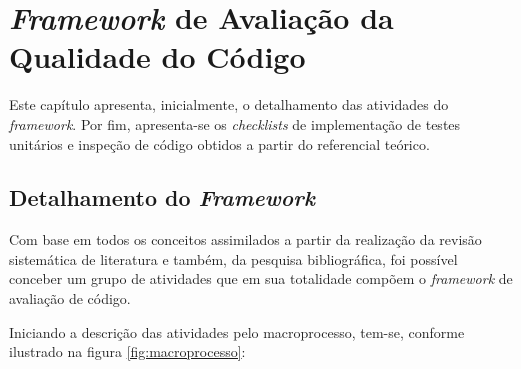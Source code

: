 \chapter{\textit{Framework} de Avaliação da Qualidade do Código}

Este capítulo apresenta, inicialmente, o detalhamento das atividades do \textit{framework}. Por fim, apresenta-se os \textit{checklists} de implementação de testes unitários e inspeção de código obtidos a partir do referencial teórico.

\section{Detalhamento do \textit{Framework}}

Com base em todos os conceitos assimilados a partir da realização da revisão sistemática de literatura e também, da pesquisa bibliográfica, foi possível conceber um grupo de atividades que em sua totalidade compõem o \textit{framework} de avaliação de código.

Iniciando a descrição das atividades pelo macroprocesso, tem-se, conforme ilustrado na figura \ref{fig:macroprocesso}:

